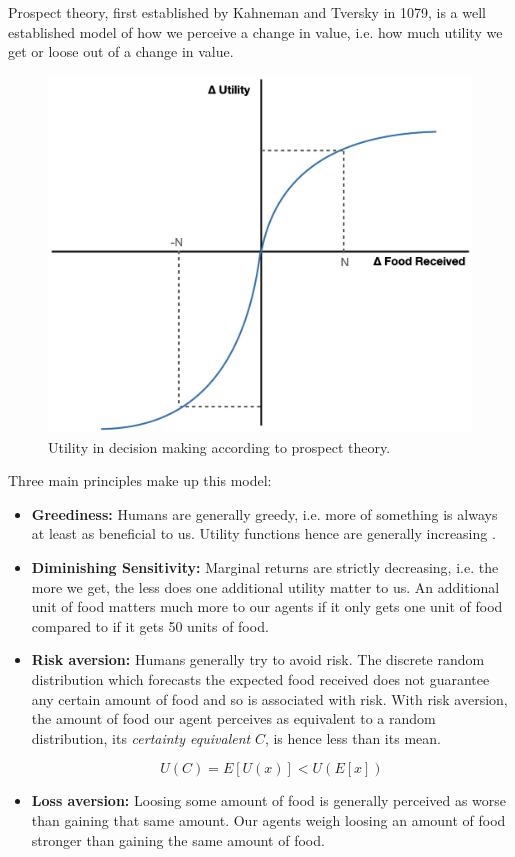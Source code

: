 Prospect theory, first established by Kahneman and Tversky in 1079, is a well established model of how we perceive a change in value, i.e. how much utility we get or loose out of a change in value. \cite{kahneman2013prospect}

\begin{figure} [h!]
    \centering
    \includegraphics[width=0.5\linewidth]{008_team_6_agent_design/Prospect_Theory.jpg}
    \caption{Utility in decision making according to prospect theory.}
    \label{fig:prospect}
\end{figure}

Three main principles make up this model:
\begin{itemize}
    \item \textbf{Greediness:} Humans are generally greedy, i.e. more of something is always at least as beneficial to us. Utility functions hence are generally increasing .
    
    \item \textbf{Diminishing Sensitivity:} Marginal returns are strictly decreasing, i.e. the more we get, the less does one additional utility matter to us. An additional unit of food matters much more to our agents if it only gets one unit of food compared to if it gets 50 units of food.
    
    \item \textbf{Risk aversion:} Humans generally try to avoid risk. The discrete random distribution which forecasts the expected food received does not guarantee any certain amount of food and so is associated with risk. 
    With risk aversion, the amount of food our agent perceives as equivalent to a random distribution, its \textit{certainty equivalent} $C$, is hence less than its mean.

    \begin{equation}
    U(C) = E[U(x)] < U(E[x])    
    \end{equation}
    
    \item \textbf{Loss aversion:} Loosing some amount of food is generally perceived as worse than gaining that same amount. Our agents weigh loosing an amount of food stronger than gaining the same amount of food.
\end{itemize}

